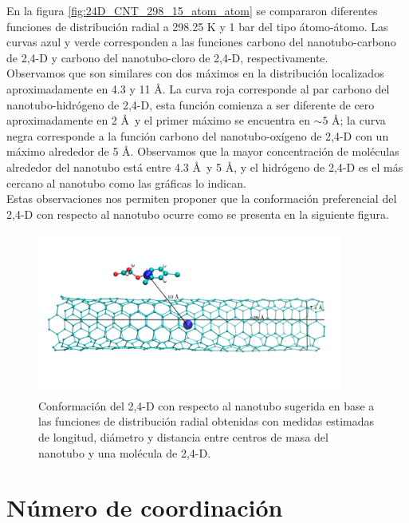 \newpage

En la figura \ref{fig:24D_CNT_298_15_atom_atom} se compararon diferentes funciones de distribución radial a 298.25 K y 1 bar del tipo átomo-átomo. Las curvas azul y verde corresponden a las funciones carbono del nanotubo-carbono de 2,4-D y carbono del nanotubo-cloro de 2,4-D, respectivamente. \\

Observamos que son similares con dos máximos en la distribución localizados aproximadamente en 4.3 y 11 \AA. La curva roja corresponde al par carbono del nanotubo-hidrógeno de 2,4-D, esta función comienza a ser diferente de cero aproximadamente en 2 \AA\  y el primer máximo se encuentra en $\sim 5$ \AA; la curva negra corresponde a la función carbono del nanotubo-oxígeno de 2,4-D con un máximo alrededor de 5 \AA. Observamos que la mayor concentración de moléculas alrededor del nanotubo está entre 4.3 \AA\  y 5 \AA, y el hidrógeno de 2,4-D es el más cercano al nanotubo como las gráficas lo indican.\\

Estas observaciones nos permiten proponer que la conformación preferencial del 2,4-D con respecto al nanotubo ocurre como se presenta en la siguiente figura.\\

\begin{figure}[!hbt]
    \centering
    \includegraphics[width=0.9\textwidth,keepaspectratio=true]{resultados/figura-resultados-rdf.png}
    \caption{Conformación del 2,4-D con respecto al nanotubo sugerida en base a las funciones de distribución radial obtenidas con medidas estimadas de longitud, diámetro y distancia entre centros de masa del nanotubo y una molécula de 2,4-D.}
    \label{fig:figura-resultados-rdf}
\end{figure}

\newpage

\section{Número de coordinación}

